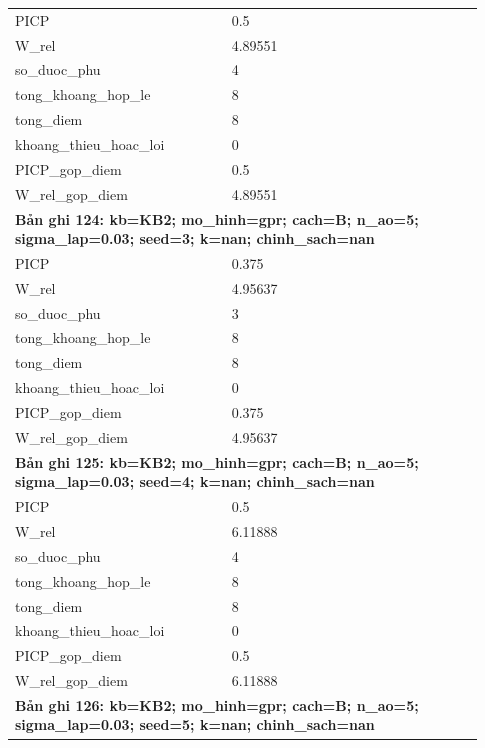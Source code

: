 \begin{longtable}{p{0.43\linewidth}p{0.50\linewidth}}
PICP & 0.5 \\
W\_\allowbreak rel & 4.89551 \\
so\_\allowbreak duoc\_\allowbreak phu & 4 \\
tong\_\allowbreak khoang\_\allowbreak hop\_\allowbreak le & 8 \\
tong\_\allowbreak diem & 8 \\
khoang\_\allowbreak thieu\_\allowbreak hoac\_\allowbreak loi & 0 \\
PICP\_\allowbreak gop\_\allowbreak diem & 0.5 \\
W\_\allowbreak rel\_\allowbreak gop\_\allowbreak diem & 4.89551 \\
\midrule
\multicolumn{2}{p{0.95\linewidth}}{\textbf{Bản ghi 124: kb=KB2; mo\_hinh=gpr; cach=B; n\_ao=5; sigma\_lap=0.03; seed=3; k=nan; chinh\_sach=nan}} \\
PICP & 0.375 \\
W\_\allowbreak rel & 4.95637 \\
so\_\allowbreak duoc\_\allowbreak phu & 3 \\
tong\_\allowbreak khoang\_\allowbreak hop\_\allowbreak le & 8 \\
tong\_\allowbreak diem & 8 \\
khoang\_\allowbreak thieu\_\allowbreak hoac\_\allowbreak loi & 0 \\
PICP\_\allowbreak gop\_\allowbreak diem & 0.375 \\
W\_\allowbreak rel\_\allowbreak gop\_\allowbreak diem & 4.95637 \\
\midrule
\multicolumn{2}{p{0.95\linewidth}}{\textbf{Bản ghi 125: kb=KB2; mo\_hinh=gpr; cach=B; n\_ao=5; sigma\_lap=0.03; seed=4; k=nan; chinh\_sach=nan}} \\
PICP & 0.5 \\
W\_\allowbreak rel & 6.11888 \\
so\_\allowbreak duoc\_\allowbreak phu & 4 \\
tong\_\allowbreak khoang\_\allowbreak hop\_\allowbreak le & 8 \\
tong\_\allowbreak diem & 8 \\
khoang\_\allowbreak thieu\_\allowbreak hoac\_\allowbreak loi & 0 \\
PICP\_\allowbreak gop\_\allowbreak diem & 0.5 \\
W\_\allowbreak rel\_\allowbreak gop\_\allowbreak diem & 6.11888 \\
\midrule
\multicolumn{2}{p{0.95\linewidth}}{\textbf{Bản ghi 126: kb=KB2; mo\_hinh=gpr; cach=B; n\_ao=5; sigma\_lap=0.03; seed=5; k=nan; chinh\_sach=nan}} \\

\end{longtable}
